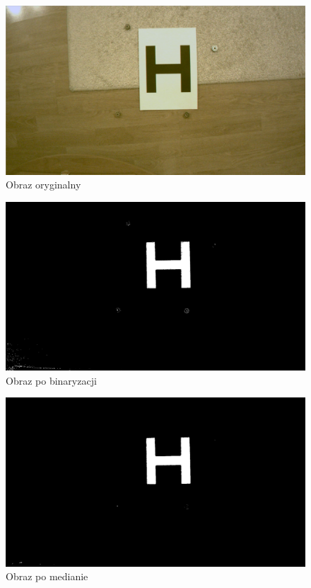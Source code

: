 \begin{figure}[h]
	\centering
	\includegraphics[width=\textwidth]{h.jpg}
	\caption{Obraz oryginalny}
	\label{fig:h}
\end{figure}
\begin{figure}[h]
	\centering
	\includegraphics[width=\textwidth]{bin.jpg}
	\caption{Obraz po binaryzacji}
	\label{fig:bin}
\end{figure}
\begin{figure}[h]
	\centering
	\includegraphics[width=\textwidth]{median.jpg}
	\caption{Obraz po medianie}
	\label{fig:median}
\end{figure}
